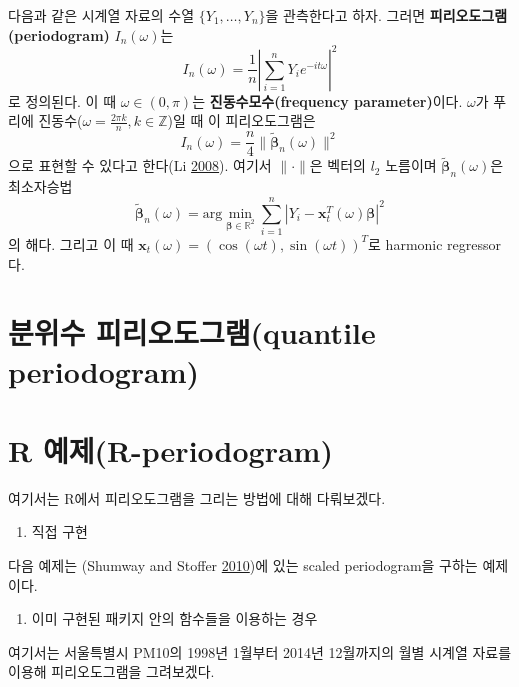 \documentclass[b5paper,]{book}
\providecommand{\tightlist}{%
  \setlength{\itemsep}{0pt}\setlength{\parskip}{0pt}}
\theoremstyle{definition}
\theoremstyle{definition}
\theoremstyle{definition}
\theoremstyle{remark}
\begin{document}
다음과 같은 시계열 자료의 수열 \(\{Y_{1}, \ldots, Y_{n}\}\)을 관측한다고
하자. 그러면 \textbf{피리오도그램(periodogram)} \(I_{n}(\omega)\)는
\[I_{n}(\omega)=\frac{1}{n}| \sum_{i=1}^{n}Y_{i}e^{-it\omega}|^{2}\] 로
정의된다. 이 때 \(\omega\in (0,\pi)\)는 \textbf{진동수모수(frequency
parameter)}이다. \(\omega\)가 푸리에
진동수(\(\omega=\frac{2\pi k}{n}, k\in\mathbb{Z}\))일 때 이
피리오도그램은
\[I_{n}(\omega)=\frac{n}{4}\| \tilde{\boldsymbol{\beta}}_{n}(\omega)\|^{2}\]
으로 표현할 수 있다고 한다(Li \protect\hyperlink{ref-Li2008}{2008}).
여기서 \(\| \cdot \|\)은 벡터의 \(l_{2}\) 노름이며
\(\tilde{\boldsymbol{\beta}}_{n}(\omega)\)은 최소자승법
\[\tilde{\boldsymbol{\beta}}_{n}(\omega)=\text{arg}\min_{\boldsymbol{\beta}\in\mathbb{R}^{2}}\sum_{i=1}^{n}| Y_{i}-\mathbf{x}_{t}^{T}(\omega)\boldsymbol{\beta}|^{2}\]
의 해다. 그리고 이 때
\(\mathbf{x}_{t}(\omega)=(\cos(\omega t), \sin (\omega t))^{T}\)로
harmonic regressor다.

\section{분위수 피리오도그램(quantile
periodogram)}\label{-quantile-periodogram}

\section{R 예제(R-periodogram)}\label{r-r-periodogram}

여기서는 R에서 피리오도그램을 그리는 방법에 대해 다뤄보겠다.

\begin{enumerate}
\def\labelenumi{\arabic{enumi}.}
\tightlist
\item
  직접 구현
\end{enumerate}

다음 예제는 (Shumway and Stoffer
\protect\hyperlink{ref-Shumway2010}{2010})에 있는 scaled periodogram을
구하는 예제이다.

\begin{enumerate}
\def\labelenumi{\arabic{enumi}.}
\setcounter{enumi}{1}
\tightlist
\item
  이미 구현된 패키지 안의 함수들을 이용하는 경우
\end{enumerate}

여기서는 서울특별시 PM10의 1998년 1월부터 2014년 12월까지의 월별 시계열
자료를 이용해 피리오도그램을 그려보겠다.
\end{document}
